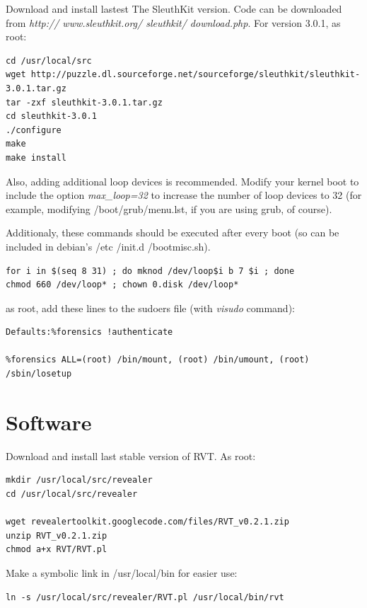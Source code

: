 \documentclass[a4paper,11pt,oneside]{report}
\begin{document}
Download and install lastest The SleuthKit version. Code can be downloaded from \emph{http:// www.sleuthkit.org/ sleuthkit/ download.php}. For version 3.0.1, as root:

\begin{verbatim}
cd /usr/local/src
wget http://puzzle.dl.sourceforge.net/sourceforge/sleuthkit/sleuthkit-3.0.1.tar.gz
tar -zxf sleuthkit-3.0.1.tar.gz
cd sleuthkit-3.0.1
./configure
make
make install
\end{verbatim}



Also, adding additional loop devices is recommended. Modify your kernel boot to include the option \emph{max\_loop=32} to increase the number of loop devices to 32 (for example, modifying /boot/grub/menu.lst, if you are using grub, of course).

Additionaly, these commands should be executed after every boot (so can be included in debian's /etc /init.d /bootmisc.sh).

\begin{verbatim}
for i in $(seq 8 31) ; do mknod /dev/loop$i b 7 $i ; done
chmod 660 /dev/loop* ; chown 0.disk /dev/loop* 
\end{verbatim}  

as root, add these lines to the sudoers file (with \emph{visudo} command):

\begin{verbatim}
Defaults:%forensics !authenticate

%forensics ALL=(root) /bin/mount, (root) /bin/umount, (root) /sbin/losetup
\end{verbatim}


\section{Software}

Download and install last stable version of RVT. As root:

\begin{verbatim}
mkdir /usr/local/src/revealer
cd /usr/local/src/revealer

wget revealertoolkit.googlecode.com/files/RVT_v0.2.1.zip
unzip RVT_v0.2.1.zip
chmod a+x RVT/RVT.pl

\end{verbatim}


Make a symbolic link in /usr/local/bin for easier use:

\begin{verbatim}
ln -s /usr/local/src/revealer/RVT.pl /usr/local/bin/rvt
\end{verbatim}
\end{document}
